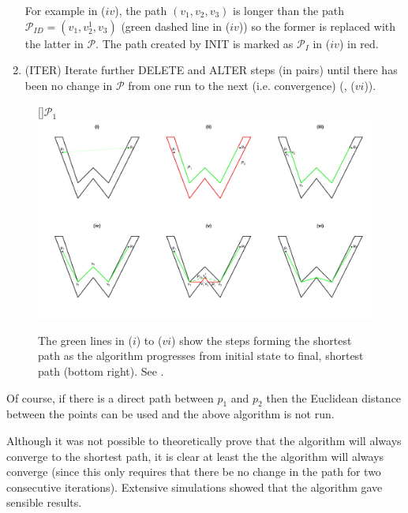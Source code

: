 \begin{enumerate}
For example in  ($iv$), the path $(v_1, v_2, v_3)$ is longer than the path $\mathcal{P}_{ID}=(v_1, v^1_2, v_3)$ (green dashed line in ($iv$)) so the former is replaced with the latter in $\mathcal{P}$. The path created by INIT is marked as $\mathcal{P}_{I}$ in  ($iv$) in red.

\item (ITER) Iterate further DELETE and ALTER steps (in pairs) until there has been no change in $\mathcal{P}$ from one run to the next (i.e. convergence) (, ($vi$)).
\end{enumerate}

\begin{figure}
[]{$\mathcal{P}_1$}
\includegraphics[trim=0in 0.5in 0in 0.25in, width=9.5in]{mds/figs/wdia.pdf} \\
\caption{The green lines in ($i$) to ($vi$) show the steps forming the shortest path as the algorithm progresses from initial state to final, shortest path (bottom right). See .}
\label{wdia}
\end{figure}

Of course, if there is a direct path between $p_1$ and $p_2$ then the Euclidean distance between the points can be used and the above algorithm is not run.

Although it was not possible to theoretically prove that the algorithm will always converge to the shortest path, it is clear at least the the algorithm will always converge (since this only requires that there be no change in the path for two consecutive iterations). Extensive simulations showed that the algorithm gave sensible results.

